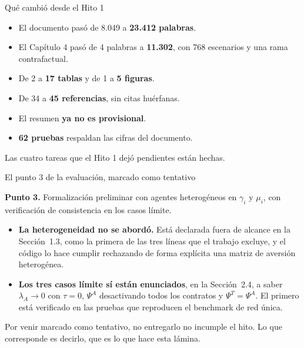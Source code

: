 \documentclass[aspectratio=169]{beamer}
\begin{document}
\begin{frame}{Qué cambió desde el Hito 1}

\begin{itemize}
  \item El documento pasó de 8.049 a \textbf{23.412 palabras}.
  \item El Capítulo 4 pasó de 4 palabras a \textbf{11.302}, con 768 escenarios y una rama contrafactual.
  \item De 2 a \textbf{17 tablas} y de 1 a \textbf{5 figuras}.
  \item De 34 a \textbf{45 referencias}, sin citas huérfanas.
  \item El resumen \textbf{ya no es provisional}.
  \item \textbf{62 pruebas} respaldan las cifras del documento.
\end{itemize}

\vfill
\begin{block}{}
\centering
Las cuatro tareas que el Hito 1 dejó pendientes están hechas.
\end{block}

\end{frame}

\begin{frame}{El punto 3 de la evaluación, marcado como tentativo}

\footnotesize
\textbf{Punto 3.} Formalización preliminar con agentes heterogéneos en $\gamma_i$ y $\mu_i$, con verificación de consistencia en los casos límite.

\vspace{0.35cm}
\begin{itemize}\footnotesize
  \item \textbf{La heterogeneidad no se abordó.} Está declarada fuera de alcance en la Sección~1.3, como la primera de las tres líneas que el trabajo excluye, y el código lo hace cumplir rechazando de forma explícita una matriz de aversión heterogénea.
  \item \textbf{Los tres casos límite sí están enunciados}, en la Sección~2.4, a saber $\lambda_A \to 0$ con $\tau = 0$, $\Psi^A$ desactivando todos los contratos y $\Psi^T = \Psi^A$. El primero está verificado en las pruebas que reproducen el benchmark de red única.
\end{itemize}

\vfill
\begin{block}{}
\centering
\small
Por venir marcado como tentativo, no entregarlo no incumple el hito. Lo que corresponde es decirlo, que es lo que hace esta lámina.
\end{block}

\end{frame}
\end{document}

